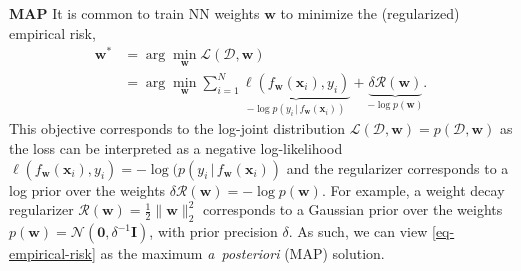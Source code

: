 \documentclass{article}
\newcommand{\dataset}{\ensuremath{\mathcal{D}}}
\newcommand{\inputDomain}{\ensuremath{\mathbb{R}^{D}}}
\newcommand{\outputDomain}{\ensuremath{\mathbb{R}^{C}}}
\newcommand{\weights}{\ensuremath{\mathbf{w}}}
\newcommand{\mbf}[1]{\mathbf{#1}}
\renewcommand{\mid}{\,|\,}
\newcommand{\MI}{\mbf{I}}
\newcommand{\vzeros}{\mbf{0}}
\newcommand{\vx}{\mbf{x}}
\newcommand{\vy}{\mbf{y}}
\newcommand{\vw}{\mbf{w}}
\newcommand{\Norm}{\mathcal{N}}
\begin{document}


\textbf{MAP}
It is common to train NN weights $\vw$ to minimize the (regularized) empirical risk,
%
\begin{align} \label{eq-empirical-risk}
  \weights^{*} &=
                 \arg \min_{\weights} \mathcal{L}(\dataset,\weights) \nonumber \\
               &=
  \arg \min_{\weights} \textstyle\sum_{i=1}^{N} \underbrace{\ell(f_\weights(\mathbf{x}_{i}), y_i)}_{-\log p(y_{i} \mid f_{\vw}(\vx_{i}))} + \underbrace{\delta \mathcal{R}(\weights)}_{-\log p(\vw)}.
\end{align}
%
This objective corresponds to the log-joint distribution $\mathcal{L}(\mathcal{D},\vw)=p(\mathcal{D}, \vw)$
as the loss can be interpreted as a negative log-likelihood $\ell(f_\weights(\vx_{i}), y_i) = -\log(p(y_{i} \mid f_\weights(\vx_{i}))$
and the regularizer corresponds to a log prior over the weights $\delta\mathcal{R}(\weights) = -\log p(\vw)$.
For example, a weight decay regularizer $\mathcal{R}(\vw) = \frac{1}{2}\|\weights\|^{2}_2$ corresponds to a Gaussian prior over the weights $p(\vw) = \Norm(\vzeros, \delta^{-1} \MI)$, with
prior precision $\delta$.
As such, we can view \cref{eq-empirical-risk} as the maximum {\it a~posteriori} (MAP) solution.

\end{document}

